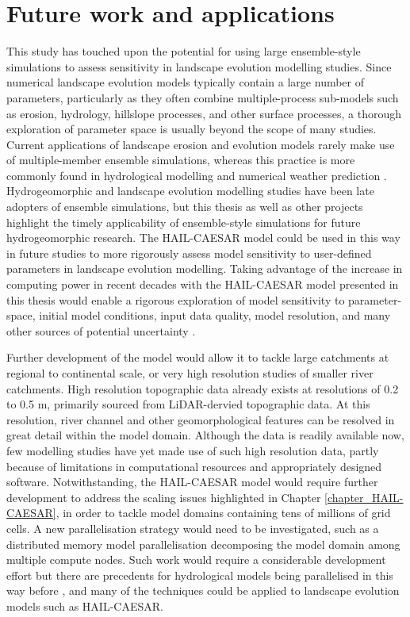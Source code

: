 \section{Future work and applications}
This study has touched upon the potential for using large ensemble-style simulations to assess sensitivity in landscape evolution modelling studies. Since numerical landscape evolution models typically contain a large number of parameters, particularly as they often combine multiple-process sub-models such as erosion, hydrology, hillslope processes, and other surface processes, a thorough exploration of parameter space is usually beyond the scope of many studies. Current applications of landscape erosion and evolution models rarely make use of multiple-member ensemble simulations, whereas this practice is more commonly found in hydrological modelling \citep{cloke2009ensemble,wong2015sensitivity} and numerical weather prediction \citep{sivillo1997ensemble}. Hydrogeomorphic and landscape evolution modelling studies have been late adopters of ensemble simulations, but this thesis as well as other projects \citep[e.g.][]{schaake2007hepex,skinner2017lemsi} highlight the timely applicability of ensemble-style simulations for future hydrogeomorphic research. The HAIL-CAESAR model could be used in this way in future studies to more rigorously assess model sensitivity to user-defined parameters in landscape evolution modelling. Taking advantage of the increase in computing power in recent decades with the HAIL-CAESAR model presented in this thesis would enable a rigorous exploration of model sensitivity to parameter-space, initial model conditions, input data quality, model resolution, and many other sources of potential uncertainty \citep{pelletier2015forecasting}.

Further development of the model would allow it to tackle large catchments at regional to continental scale, or very high resolution studies of smaller river catchments. High resolution topographic data already exists at resolutions of 0.2 to 0.5 m, primarily sourced from LiDAR-dervied topographic data. At this resolution, river channel and other geomorphological features can be resolved in great detail within the model domain. Although the data is readily available now, few modelling studies have yet made use of such high resolution data, partly because of limitations in computational resources and appropriately designed software. Notwithstanding, the HAIL-CAESAR model would require further development to address the scaling issues highlighted in Chapter \ref{chapter_HAIL-CAESAR}, in order to tackle model domains containing tens of millions of grid cells. A new parallelisation strategy would need to be investigated, such as a distributed memory model parallelisation decomposing the model domain among multiple compute nodes. Such work would require a considerable development effort but there are precedents for hydrological models being parallelised in this way before \citep{vivoni2011real}, and many of the techniques could be applied to landscape evolution models such as HAIL-CAESAR.
 
